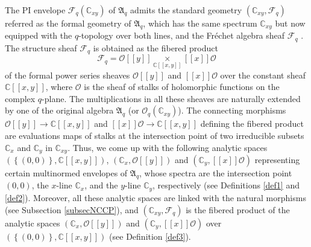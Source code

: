 \documentclass[12pt,reqno]{amsart}%
\theoremstyle{plain}
\numberwithin{theorem}{section} \numberwithin{equation}{section}
\numberwithin{lemma}{section}
\numberwithin{remark}{section}
\numberwithin{example}{section}
\numberwithin{proposition}{section}
\numberwithin{definition}{section}
\numberwithin{corollary}{section}
\begin{document}
The PI envelope $\mathcal{F}_{q}\left(  \mathbb{C}_{xy}\right)  $ of
$\mathfrak{A}_{q}$ admits the standard geometry $\left(  \mathbb{C}%
_{xy},\mathcal{F}_{q}\right)  $ referred as the formal geometry of
$\mathfrak{A}_{q}$, which has the same spectrum $\mathbb{C}_{xy}$ but now
equipped with the $q$-topology over both lines, and the Fr\'{e}chet algebra
sheaf $\mathcal{F}_{q}$ \cite{Dosi25}. The structure sheaf $\mathcal{F}_{q}$
is obtained as the fibered product
\[
\mathcal{F}_{q}=\mathcal{O}\left[  \left[  y\right]  \right]
\underset{\mathbb{C}\left[  \left[  x,y\right]  \right]  }{\times}\left[
\left[  x\right]  \right]  \mathcal{O}%
\]
of the formal power series sheaves $\mathcal{O}\left[  \left[  y\right]
\right]  $ and $\left[  \left[  x\right]  \right]  \mathcal{O}$ over the
constant sheaf $\mathbb{C}\left[  \left[  x,y\right]  \right]  $, where
$\mathcal{O}$ is the sheaf of stalks of holomorphic functions on the complex
$q$-plane. The multiplications in all these sheaves are naturally extended by
one of the original algebra $\mathfrak{A}_{q}$ (or $\mathcal{O}_{q}\left(
\mathbb{C}_{xy}\right)  $). The connecting morphisms $\mathcal{O}\left[
\left[  y\right]  \right]  \rightarrow\mathbb{C}\left[  \left[  x,y\right]
\right]  $ and $\left[  \left[  x\right]  \right]  \mathcal{O}\rightarrow
\mathbb{C}\left[  \left[  x,y\right]  \right]  $ defining the fibered product
are evaluations maps of stalks at the intersection point of two irreducible
subsets $\mathbb{C}_{x}$ and $\mathbb{C}_{y}$ in $\mathbb{C}_{xy}$. Thus, we
come up with the following analytic spaces $\left(  \left\{  \left(
0,0\right)  \right\}  ,\mathbb{C}\left[  \left[  x,y\right]  \right]  \right)
$, $\left(  \mathbb{C}_{x},\mathcal{O}\left[  \left[  y\right]  \right]
\right)  $ and $\left(  \mathbb{C}_{y},\left[  \left[  x\right]  \right]
\mathcal{O}\right)  $ representing certain multinormed envelopes of
$\mathfrak{A}_{q}$, whose spectra are the intersection point $\left(
0,0\right)  $, the $x$-line $\mathbb{C}_{x}$, and the $y$-line $\mathbb{C}%
_{y}$, respectively (see Definitions \ref{def1} and \ref{def2}). Moreover, all
these analytic spaces are linked with the natural morphisms (see Subsection
\ref{subsecNCCP}), and $\left(  \mathbb{C}_{xy},\mathcal{F}_{q}\right)  $ is
the fibered product of the analytic spaces $\left(  \mathbb{C}_{x}%
,\mathcal{O}\left[  \left[  y\right]  \right]  \right)  $ and $\left(
\mathbb{C}_{y},\left[  \left[  x\right]  \right]  \mathcal{O}\right)  $ over
$\left(  \left\{  \left(  0,0\right)  \right\}  ,\mathbb{C}\left[  \left[
x,y\right]  \right]  \right)  $ (see Definition \ref{def3}).
\end{document}
